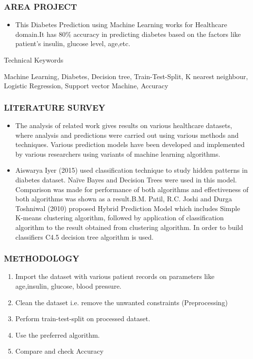 \documentclass{beamer}
\begin{document}
\begin{frame}
\frametitle{\bf AREA PROJECT}
  \begin{itemize}
      \item \normalsize{This Diabetes Prediction using Machine Learning works for Healthcare domain.It has 80\% accuracy in predicting diabetes based on the factors like patient’s insulin, glucose level, age,etc.}
  \end{itemize}
\begin{block}
    {}
    Technical Keywords
  \end{block}
  \normalsize{Machine Learning, Diabetes, Decision tree, Train-Test-Split, K nearest neighbour, Logistic Regression, Support vector Machine, Accuracy
}  
  \end{frame}
  
 \begin{frame}
\frametitle{\bf LITERATURE SURVEY}
  \begin{itemize}
      
      \item \normalsize{The analysis of related work gives results on various healthcare datasets, where analysis and predictions were carried out using various methods and techniques. Various prediction models have been developed and implemented by various researchers using variants of machine learning algorithms.}
     
      \item \normalsize{Aiswarya Iyer (2015) used classification technique to study hidden patterns in diabetes dataset. Naïve Bayes and Decision Trees were used in this model. Comparison was made for performance of both algorithms and effectiveness of both algorithms was shown as a result.B.M. Patil, R.C. Joshi and Durga Toshniwal (2010) proposed Hybrid Prediction Model which includes Simple K-means clustering algorithm, followed by application of classification algorithm to the result obtained from clustering algorithm. In order to build classifiers C4.5 decision tree algorithm is used.}
  \end{itemize}
  \end{frame}

\begin{frame}
\frametitle{\bf METHODOLOGY}
  \begin{enumerate}
      \item Import the dataset with various patient records on parameters like age,insulin, glucose, blood pressure.
      \item Clean the dataset i.e. remove the unwanted constraints (Preprocessing)
      \item Perform train-test-split on processed dataset.
      \item Use the preferred algorithm.
      \item Compare and check Accuracy

  \end{enumerate}
\end{frame}
\end{document}
